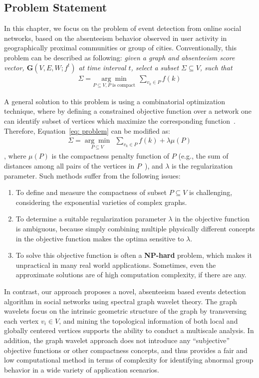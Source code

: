 \subsection{Problem Statement}
\label{sec:problemformulation}
In this chapter, we focus on the problem of event detection from online social networks, based on the absenteeism behavior observed in user activity in geographically proximal communities or group of cities.
Conventionally, this problem can be described as following: \emph{given a graph and \textit{absenteeism score} vector, $\mathbf{G}(V,E,W;f^t)$ at time interval $t$, select a subset $\Sigma \subseteq V$, such that
\begin{eqnarray}
 \label{eq: problem}
    \Sigma=\underset{P\subseteq V, P \mbox{ is compact}}{\arg\min}\ \ \sum_{v_k\in P} {f(k)}
\end{eqnarray} }

A general solution to this problem is using a combinatorial optimization technique, where by defining a constrained objective function over a network one can identify subset of vertices which maximize the corresponding function~\cite{rozenshtein2014event}. Therefore, Equation~\ref{eq: problem} can be modified as:
\begin{eqnarray}
 \label{eq: problem_conventional}
    \Sigma=\underset{P\subseteq V}{\arg\min}\ \ \sum_{v_k\in P} {f(k)}+\lambda \mu(P)
\end{eqnarray}
, where $\mu(P)$ is the compactness penalty function of $P$ (e.g., the sum of distances among
all pairs of the vertices in $P$~\cite{rozenshtein2014event}), and $\lambda$ is the regularization parameter.
Such methods suffer from the following issues:
\vspace{-1.5mm}
\begin{enumerate}
\item To define and measure the compactness of subset $P\subseteq V$ is challenging, considering the exponential varieties of complex graphs.
\item To determine a suitable regularization parameter $\lambda$ in the objective function is ambiguous, because simply combining multiple physically different concepts in the objective function makes the optima sensitive to $\lambda$.
\item To solve this objective function is often a \textbf{NP-hard} problem, which makes it unpractical in many real world applications. Sometimes, even the approximate solutions are of high computation complexity, if there are any.
\end{enumerate}
\vspace{-1.5mm}
In contrast, our approach proposes a novel, absenteeism based events detection algorithm in social networks using spectral graph wavelet theory.
The graph wavelets focus on the intrinsic geometric structure of the graph by transversing each vertex $v_i\in V$, and mining the topological information of both local and globally centered vertices supports the ability to conduct a multiscale analysis.
In addition, the graph wavelet approach does not introduce any ``subjective'' objective functions or other compactness concepts, and thus provides a fair and low computational method in terms of complexity for identifying abnormal group behavior in a wide variety of application scenarios.


